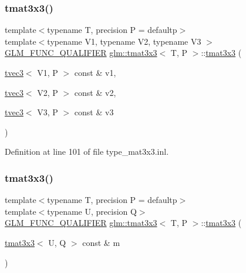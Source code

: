 \subsubsection{\texorpdfstring{tmat3x3()}{tmat3x3()}\hspace{0.1cm}{\footnotesize\ttfamily [21/22]}}
{\footnotesize\ttfamily template$<$typename T, precision P = defaultp$>$ \\
template$<$typename V1, typename V2, typename V3 $>$ \\
\mbox{\hyperlink{setup_8hpp_a33fdea6f91c5f834105f7415e2a64407}{G\+L\+M\+\_\+\+F\+U\+N\+C\+\_\+\+Q\+U\+A\+L\+I\+F\+I\+ER}} \mbox{\hyperlink{structglm_1_1tmat3x3}{glm\+::tmat3x3}}$<$ T, P $>$\+::\mbox{\hyperlink{structglm_1_1tmat3x3}{tmat3x3}} (\begin{DoxyParamCaption}\item[{\mbox{\hyperlink{structglm_1_1tvec3}{tvec3}}$<$ V1, P $>$ const \&}]{v1,  }\item[{\mbox{\hyperlink{structglm_1_1tvec3}{tvec3}}$<$ V2, P $>$ const \&}]{v2,  }\item[{\mbox{\hyperlink{structglm_1_1tvec3}{tvec3}}$<$ V3, P $>$ const \&}]{v3 }\end{DoxyParamCaption})}



Definition at line 101 of file type\+\_\+mat3x3.\+inl.

\mbox{\label{structglm_1_1tmat3x3_afdeefb27eb8d3d2a1b10d08487e6a1c9}} 
\subsubsection{\texorpdfstring{tmat3x3()}{tmat3x3()}\hspace{0.1cm}{\footnotesize\ttfamily [22/22]}}
{\footnotesize\ttfamily template$<$typename T, precision P = defaultp$>$ \\
template$<$typename U, precision Q$>$ \\
\mbox{\hyperlink{setup_8hpp_a33fdea6f91c5f834105f7415e2a64407}{G\+L\+M\+\_\+\+F\+U\+N\+C\+\_\+\+Q\+U\+A\+L\+I\+F\+I\+ER}} \mbox{\hyperlink{structglm_1_1tmat3x3}{glm\+::tmat3x3}}$<$ T, P $>$\+::\mbox{\hyperlink{structglm_1_1tmat3x3}{tmat3x3}} (\begin{DoxyParamCaption}\item[{\mbox{\hyperlink{structglm_1_1tmat3x3}{tmat3x3}}$<$ U, Q $>$ const \&}]{m }\end{DoxyParamCaption})}



